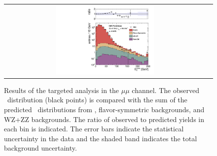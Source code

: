 \clearpage

\begin{figure}[!h]
\begin{center}
\begin{tabular}{cc}
\includegraphics[width=0.5\textwidth]{plots/pfmet_bveto_mm_19fb.pdf}
\end{tabular}
\caption{Results of the targeted analysis in the $\mu\mu$ channel. The observed \MET\ distribution (black points) is compared with the sum of the predicted \MET\
distributions from \zjets, flavor-symmetric backgrounds, and WZ+ZZ backgrounds. The ratio of observed to predicted yields in each bin is
indicated. The error bars indicate the statistical uncertainty in the data and the shaded band indicates the total background uncertainty.
\label{fig:results_targ_mm}
}
\end{center}
\end{figure}



